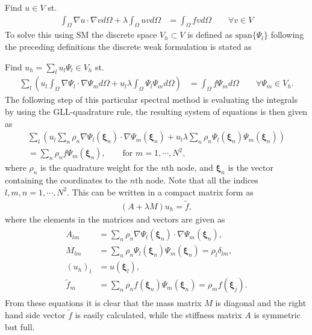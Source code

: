 Find $u\in V$ st. 
%
\begin{align}
    \int_{\Omega}\nabla u \cdot \nabla v d \Omega + \lambda \int_{\Omega} u vd \Omega 
    &= \int_{\Omega}f vd \Omega \qquad \forall v \in V
    \label{eq:Helmholtzweak}
\end{align}
%
To solve this using SM the discrete space $V_h \subset V$ is defined as $\text{span}\{\Psi_l\}$ following the preceding definitions 
the discrete weak formulation is stated as 

Find $u_h = \sum_l u_l \Psi_l \in V_h$ st. 
%
\begin{align}
    \sum_l\left(  u_l\int_{\Omega}\nabla \Psi_l \cdot \nabla \Psi_m d \Omega + u_l\lambda \int_{\Omega} \Psi_l \Psi_md \Omega \right)
    &= \int_{\Omega}f \Psi_md \Omega \qquad \forall \Psi_m \in V_h.
    \label{eq:Helmholtzdiscrete}
\end{align}
%
The following step of this particular spectral method is evaluating the integrals by using the GLL-quadrature rule, the resulting system of equations 
is then given as 
%
\begin{align}
    \sum_l\left(  u_l\sum_n \rho_n\nabla \Psi_l(\boldsymbol\xi_{n}) \cdot \nabla \Psi_m(\boldsymbol\xi_{n}) + u_l\lambda \sum_n \rho_n \Psi_l(\boldsymbol\xi_{n}) \Psi_m(\boldsymbol\xi_{n})\right)\\
    = \sum_n \rho_nf \Psi_m(\boldsymbol\xi_{n}),\qquad \text{for } m = 1,\cdots,N^2,
    \label{eq:Helmholtzquad}
\end{align}
%
where $\rho_n$ is the quadrature weight for the $n$th node, and $\boldsymbol\xi_n$ is the vector containing the coordinates to the $n$th node.
Note that all the indices $l,m,n=1,\cdots,N^{2}$.
This can be written in a compact matrix form as 
\begin{align}
    (A+\lambda M)u_h = \tilde f,
    \label{eq:Helmholtzmat}
\end{align}
where the elements in the matrices and vectors are given as 
\begin{align}
    \begin{split}
        A_{lm} &= \sum_n \rho_n\nabla \Psi_l(\boldsymbol\xi_{n}) \cdot \nabla \Psi_m(\boldsymbol\xi_{n}),\\
        M_{lm} &= \sum_n \rho_n \Psi_l(\boldsymbol\xi_{n}) \Psi_m(\boldsymbol\xi_{n}) = \rho_l\delta_{lm},\\
        (u_h)_l & = u(\boldsymbol\xi_l), \\
        \tilde f_m &= \sum_n \rho_n f(\boldsymbol\xi_{n}) \Psi_m(\boldsymbol\xi_{n}) = \rho_m f(\boldsymbol\xi_{j}).
    \end{split}
    \label{eq:Helmholtzmatelem}
\end{align}
From these equations it is clear that the mass matrix $M$ is diagonal and the right hand side vector $\tilde f$ is easily calculated, 
while the stiffness matrix $A$ is symmetric but full.

